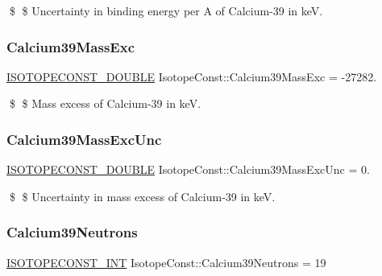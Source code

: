 \$ \$ Uncertainty in binding energy per A of Calcium-\/39 in keV. \mbox{\label{group___isotope_const-_calcium-_ca39_ga3ce6960bc2fcfd7fc9a0a430f04a105c}} 
\subsubsection{\texorpdfstring{Calcium39\+Mass\+Exc}{Calcium39MassExc}}
{\footnotesize\ttfamily \mbox{\hyperlink{group___isotope_const-_macros_ga8f45a7272ce02c0b4c65c44636ed719a}{I\+S\+O\+T\+O\+P\+E\+C\+O\+N\+S\+T\+\_\+\+D\+O\+U\+B\+LE}} Isotope\+Const\+::\+Calcium39\+Mass\+Exc = -\/27282.}

\$ \$ Mass excess of Calcium-\/39 in keV. \mbox{\label{group___isotope_const-_calcium-_ca39_ga84151a257be08ee8691e3abf1946f565}} 
\subsubsection{\texorpdfstring{Calcium39\+Mass\+Exc\+Unc}{Calcium39MassExcUnc}}
{\footnotesize\ttfamily \mbox{\hyperlink{group___isotope_const-_macros_ga8f45a7272ce02c0b4c65c44636ed719a}{I\+S\+O\+T\+O\+P\+E\+C\+O\+N\+S\+T\+\_\+\+D\+O\+U\+B\+LE}} Isotope\+Const\+::\+Calcium39\+Mass\+Exc\+Unc = 0.}

\$ \$ Uncertainty in mass excess of Calcium-\/39 in keV. \mbox{\label{group___isotope_const-_calcium-_ca39_ga960d2484184545f7ba0a67df02e04c82}} 
\subsubsection{\texorpdfstring{Calcium39\+Neutrons}{Calcium39Neutrons}}
{\footnotesize\ttfamily \mbox{\hyperlink{group___isotope_const-_macros_ga5f18360b3e99483a35c32d789e62621c}{I\+S\+O\+T\+O\+P\+E\+C\+O\+N\+S\+T\+\_\+\+I\+NT}} Isotope\+Const\+::\+Calcium39\+Neutrons = 19}


